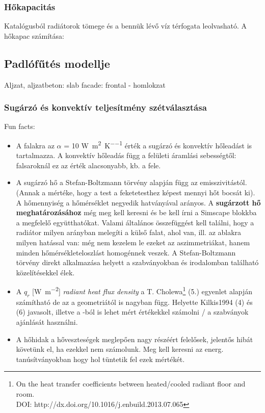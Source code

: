 \subsubsection{Hőkapacitás}

Katalógusból radiátorok tömege és a bennük lévő víz térfogata leolvasható. A hőkapac számítása:

\subsection{Padlófűtés modellje}

Aljzat, aljzatbeton: slab
facade: frontal - homlokzat





\subsubsection{Sugárzó és konvektív teljesítmény szétválasztása}

Fun facts:
~
\begin{itemize}[itemsep=6pt,topsep=0pt,parsep=0pt,partopsep=0pt]
	\item A falakra az $\alpha$ = 10 \si[per-mode = fraction]{\watt\per\meter\squared\per\kelvin} érték a sugárzó és konvektív hőleadást is tartalmazza. A konvektív hőleadás függ a felületi áramlási sebességtől: falsaroknál ez az érték alacsonyabb, kb. a fele.
	\item A sugárzó hő a Stefan-Boltzmann törvény alapján függ az emisszivitástól. (Annak a mértéke, hogy a test a feketetesthez képest mennyi hőt bocsát ki). A hőmennyiség a hőmérséklet negyedik hatványával arányos. A \textbf{sugárzott hő meghatározásához} még meg kell keresni és be kell írni a Simscape blokkba a megfelelő együtthatókat. Valami általános összefüggést kell találni, hogy a radiátor milyen arányban melegíti a külső falat, ahol van, ill. az ablakra milyen hatással van: még nem kezelem le ezeket az aszimmetriákat, hanem minden hőmérsékleteloszlást homogénnek veszek. A Stefan-Boltzmann törvény direkt alkalmazása helyett a szabványokban és irodalomban található közelítésekkel élek.
	\item A $q_r$ [\si[per-mode = fraction]{\watt\per\meter\squared}] \textit{radiant heat flux density} a \cite{CHOLEWA2013599} T. Cholewa\footnote{On the heat transfer coefficients between heated/cooled radiant floor and room. \\ DOI: http://dx.doi.org/10.1016/j.enbuild.2013.07.065} (5.) egyenlet alapján számítható de az a geometriától is nagyban függ. Helyette Kilkis1994 (4) és (6) javasolt, illetve a \cite{CHOLEWA2013599}-ból is lehet mért értékekkel számolni / a szabványok ajánlását használni.
	\item A hőhidak a hőveszteségek meglepően nagy részéért felelősek, jelentős hibát követünk el, ha ezekkel nem számolunk. Meg kell keresni az energ. tanúsítványokban hogy hol tüntetik fel ezek mértékét.
	
	
\end{itemize} 

